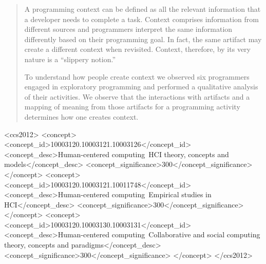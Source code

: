 \documentclass[sigconf]{acmart}
\begin{document}
\begin{abstract}
A programming context can be defined as all the relevant information that a developer needs to complete a task. Context comprises information from different sources and programmers interpret the same information differently based on their programming goal. In fact, the same artifact may create a different context when revisited. Context, therefore, by its very nature is a ``slippery notion.''

To understand how people create context we observed six programmers engaged in exploratory programming and performed a qualitative analysis of their activities. We observe that the interactions with artifacts and a mapping of meaning from those artifacts for a programming activity determines how one creates context.
\end{abstract}

%
%
\begin{CCSXML}
<ccs2012>
<concept>
<concept_id>10003120.10003121.10003126</concept_id>
<concept_desc>Human-centered computing~HCI theory, concepts and models</concept_desc>
<concept_significance>300</concept_significance>
</concept>
<concept>
<concept_id>10003120.10003121.10011748</concept_id>
<concept_desc>Human-centered computing~Empirical studies in HCI</concept_desc>
<concept_significance>300</concept_significance>
</concept>
<concept>
<concept_id>10003120.10003130.10003131</concept_id>
<concept_desc>Human-centered computing~Collaborative and social computing theory, concepts and paradigms</concept_desc>
<concept_significance>300</concept_significance>
</concept>
</ccs2012>
\end{CCSXML}





\maketitle








 
\end{document}

